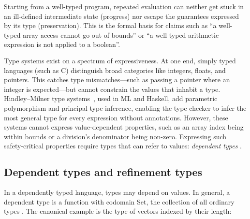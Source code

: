 Starting from a well-typed program, repeated evaluation can neither get stuck in an ill-defined intermediate state (progress) nor escape the guarantees expressed by its type (preservation). This is the formal basis for claims such as ``a well-typed array access cannot go out of bounds'' or ``a well-typed arithmetic expression is not applied to a boolean''.


Type systems exist on a spectrum of expressiveness. At one end, simply typed languages (such as C) distinguish broad categories like integers, floats, and pointers. This catches type mismatches---such as passing a pointer where an integer is expected---but cannot constrain the values that inhabit a type. Hindley--Milner type systems~\cite{Milner1978Theory}, used in ML and Haskell, add parametric polymorphism and principal type inference, enabling the type checker to infer the most general type for every expression without annotations. However, these systems cannot express value-dependent properties, such as an array index being within bounds or a division's denominator being non-zero. Expressing such safety-critical properties require types that can refer to values: \emph{dependent types} \cite{MARTINLOF1982153}.

\subsection{Dependent types and refinement types}\label{sec:dependent-types}

In a dependently typed language, types may depend on values. In general, a dependent type is a function with codomain \textsf{Set}, the collection of all ordinary types \cite{bove2009dependent}. The canonical example is the type of vectors indexed by their length:

